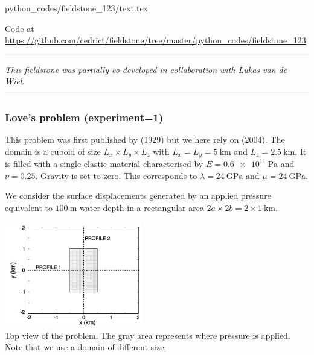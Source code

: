 \begin{flushright} {\tiny {\color{gray} python\_codes/fieldstone\_123/text.tex}} \end{flushright}



\begin{center}

Code at \url{https://github.com/cedrict/fieldstone/tree/master/python_codes/fieldstone_123}
\end{center}

\par\noindent\rule{\textwidth}{0.4pt}

{\sl This fieldstone was partially co-developed in collaboration with Lukas van de Wiel}. 

\par\noindent\rule{\textwidth}{0.4pt}

\subsubsection*{Love's problem (experiment=1)}

This problem was first published by \textcite{love29} (1929)
but we here rely on \textcite{bebe04} (2004).
The domain is a cuboid of size $L_x\times L_y \times L_z$ with $L_x=L_y=\SI{5}{\km}$
and $L_z=\SI{2.5}{\km}$. It is filled with a single elastic material characterised 
by $E=\SI{0.6e11}{\pascal}$ and $\nu=0.25$. Gravity is set to zero.
This corresponds to $\lambda= \SI{24}{\giga\pascal}$ and $\mu=\SI{24}{\giga\pascal}$.

We consider the surface displacements generated by an 
applied pressure equivalent to $\SI{100}{\meter}$ 
water depth in a rectangular area $2a\times 2b = 2\times 1~\si{\km}$. 

\begin{center}
\includegraphics[width=6cm]{python_codes/fieldstone_123/images/fig1}\\
{\captionfont Top view of the problem. The gray area represents where 
pressure is applied. Note that we use a domain of different size.}
\end{center}

